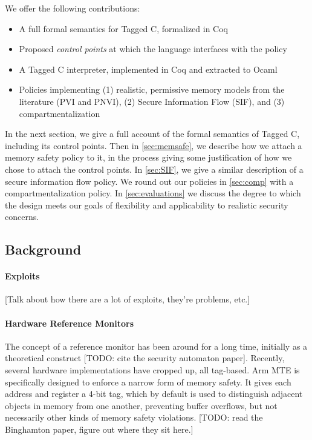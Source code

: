 \documentclass[acmsmall,review,anonymous]{acmart}\settopmatter{printfolios=true,printccs=false,printacmref=false}
\begin{document}
We offer the following contributions:

\begin{itemize}
\item A full formal semantics for Tagged C, formalized in Coq
\item Proposed {\em control points} at which the language interfaces with the policy
\item A Tagged C interpreter, implemented in Coq and extracted to Ocaml
\item Policies implementing (1) realistic, permissive memory models from the literature (PVI and PNVI),
  (2) Secure Information Flow (SIF), and (3) compartmentalization
\end{itemize}

In the next section, we give a full account of the formal semantics of Tagged C,
including its control points. Then in \cref{sec:memsafe}, we describe how we attach
a memory safety policy to it, in the process giving some justification of how we chose to
attach the control points. In \cref{sec:SIF}, we give a similar description of
a secure information flow policy. We round out our policies in \cref{sec:comp} with
a compartmentalization policy. In \cref{sec:evaluations} we discuss the degree to
which the design meets our goals of flexibility and applicability to realistic
security concerns.

\subsection{Background}

\paragraph{Exploits}

[Talk about how there are a lot of exploits, they're problems, etc.]

\paragraph{Hardware Reference Monitors}

The concept of a reference monitor has been around for a long time, initially as a theoretical
construct [TODO: cite the security automaton paper]. Recently, several hardware implementations have
cropped up, all tag-based. Arm MTE is specifically designed to enforce a narrow form of memory safety.
It gives each address and register a 4-bit tag, which by default is used to distinguish adjacent objects
in memory from one another, preventing buffer overflows, but not necessarily other kinds of memory safety
violations.
[TODO: read the Binghamton paper, figure out where they sit here.] 
\end{document}
